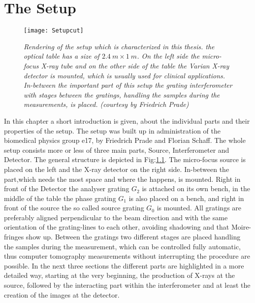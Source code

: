 \chapter{The Setup}\label{chap:setup}
\begin{figure}[h]
	\begin{center}
		\texttt{[image: Setupcut]}
	\end{center}
	\caption[Rendering of the whole setup]{\textit{Rendering of the setup which is characterized in this thesis. the optical table has a size of $2.4\ m \times 1\ m$. On the left side the micro-focus X-ray tube and on the other side of the table the Varian X-ray detector is mounted, which is usually used for clinical applications. In-between the important part of this setup the grating interferometer with stages between the gratings, handling the samples during the measurements, is placed. \tiny{(courtesy by Friedrich Prade)}}} 
	\label{setup}
\end{figure}
In this chapter a short introduction is given, about the individual parts and their properties of the setup. The setup was built up in administration of the biomedical physics group e17, by Friedrich Prade and Florian Schaff.  The whole setup consists more or less of three main parts, Source, Interferometer and Detector. The general structure is depicted in Fig:\ref{setup}. The micro-focus source is placed on the left and the X-ray detector on the right side. In-between the part,which needs the most space and where the  happens, is mounted. Right in front of the Detector the analyser grating $G_{2}$ is attached on its own bench, in the middle of the table the phase grating $G_{1}$ is also placed on a bench, and right in front of the source the so called source grating $G_{0}$ is mounted. All gratings are preferably aligned perpendicular to the beam direction and with the same orientation of the grating-lines to each other, avoiding shadowing and that Moire-fringes show up. Between the gratings two different stages are placed handling the samples during the measurement, which can be controlled fully automatic, thus computer tomography measurements without interrupting the procedure are possible. In the next three sections the different parts are highlighted in a more detailed way, starting at the very beginning, the production of X-rays at the source, followed by the interacting part within the interferometer and at least the creation of the images at the detector. 
